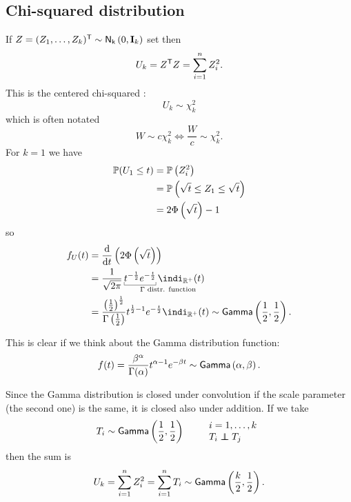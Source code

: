 \documentclass[12pt]{report}
\begin{document}
\subsection{Chi-squared distribution}
If $Z=(Z_{1},\ldots,Z_{k})^{\mathsf{T}}\sim\mathsf{N}_{\mathsf{k}}\left(0,\mathbf{I}_{k}\right)$ set then 
\begin{equation*}
	U_{k}=Z^{\mathsf{T}}Z=\sum_{i=1}^{n}Z_{i}^{2}.
\end{equation*}
This is the centered chi-squared \rv:
\begin{equation*}
	U_{k}\sim\chi^{2}_{k}
\end{equation*}
which is often notated
\begin{equation*}
	W\sim c\chi^{2}_{k}\iff \frac{W}{c}\sim\chi^{2}_{k}.
\end{equation*}
For $k=1$ we have 
\begin{align*}
	\mathbb{P}(U_{1}\leq t)&=\mathbb{P}\left(Z^{2}_{i}\right)\\
	&=\mathbb{P}\left(\sqrt{t}\leq Z_{1}\leq\sqrt{t}\right)\\
	&=2\Phi\left(\sqrt{t}\right)-1
\end{align*}
so
\begin{align*}
	f_{U}(t)&=\frac{\dif}{\dt}\left(2\Phi\left(\sqrt{t}\right)\right)\\
	&=\frac{1}{\sqrt{2\pi}}\ubracketthin{t^{-\unmezz}e^{-\frac{t}{2}}}_{\mathrlap{\text{$\Gamma$ distr. function}}}\indi_{\R^{+}}(t)\\
	&=\frac{\left(\unmezz\right)^{\unmezz}}{\Gamma\left(\unmezz\right)}t^{\unmezz-1}e^{-\frac{t}{2}}\indi_{\R^{+}}(t)\distgamma{\frac{1}{2},\unmezz}.
\end{align*}
\begin{revise}
	This is clear if we think about the Gamma distribution function:
\begin{equation*}
	f(t)=\frac{\beta^{\alpha}}{\Gamma(\alpha)}t^{\alpha-1}e^{-\beta t}\sim\mathsf{Gamma}\left(\alpha,\beta\right).
\end{equation*}
\end{revise}
Since the Gamma distribution is closed under convolution if the scale parameter (the second one) is the same, it is closed also under addition. If we take 
\begin{equation*}
	T_{i}\distgamma{\unmezz,\unmezz}\qquad\begin{array}{l}
		i=1,\ldots,k\\
		T_{i}\indep T_{j}
	\end{array}
\end{equation*}
then the sum is
\begin{equation*}
	U_{k}=\sum_{i=1}^{n}Z_{i}^{2}=\sum_{i=1}^{n}T_{i}\sim\mathsf{Gamma}\left(\frac{k}{2},\frac{1}{2}\right).
\end{equation*}
\end{document}
